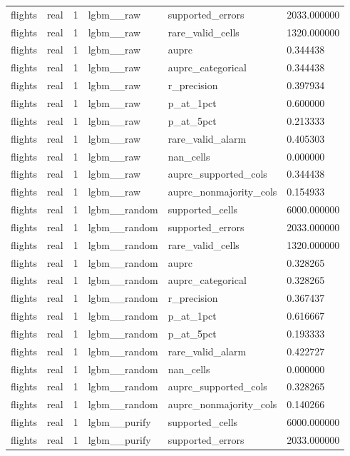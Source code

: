 \begin{tabular}{llllll}
flights & real & 1 & lgbm\_\_raw & supported\_errors & 2033.000000 \\
flights & real & 1 & lgbm\_\_raw & rare\_valid\_cells & 1320.000000 \\
flights & real & 1 & lgbm\_\_raw & auprc & 0.344438 \\
flights & real & 1 & lgbm\_\_raw & auprc\_categorical & 0.344438 \\
flights & real & 1 & lgbm\_\_raw & r\_precision & 0.397934 \\
flights & real & 1 & lgbm\_\_raw & p\_at\_1pct & 0.600000 \\
flights & real & 1 & lgbm\_\_raw & p\_at\_5pct & 0.213333 \\
flights & real & 1 & lgbm\_\_raw & rare\_valid\_alarm & 0.405303 \\
flights & real & 1 & lgbm\_\_raw & nan\_cells & 0.000000 \\
flights & real & 1 & lgbm\_\_raw & auprc\_supported\_cols & 0.344438 \\
flights & real & 1 & lgbm\_\_raw & auprc\_nonmajority\_cols & 0.154933 \\
flights & real & 1 & lgbm\_\_random & supported\_cells & 6000.000000 \\
flights & real & 1 & lgbm\_\_random & supported\_errors & 2033.000000 \\
flights & real & 1 & lgbm\_\_random & rare\_valid\_cells & 1320.000000 \\
flights & real & 1 & lgbm\_\_random & auprc & 0.328265 \\
flights & real & 1 & lgbm\_\_random & auprc\_categorical & 0.328265 \\
flights & real & 1 & lgbm\_\_random & r\_precision & 0.367437 \\
flights & real & 1 & lgbm\_\_random & p\_at\_1pct & 0.616667 \\
flights & real & 1 & lgbm\_\_random & p\_at\_5pct & 0.193333 \\
flights & real & 1 & lgbm\_\_random & rare\_valid\_alarm & 0.422727 \\
flights & real & 1 & lgbm\_\_random & nan\_cells & 0.000000 \\
flights & real & 1 & lgbm\_\_random & auprc\_supported\_cols & 0.328265 \\
flights & real & 1 & lgbm\_\_random & auprc\_nonmajority\_cols & 0.140266 \\
flights & real & 1 & lgbm\_\_purify & supported\_cells & 6000.000000 \\
flights & real & 1 & lgbm\_\_purify & supported\_errors & 2033.000000 \\

\end{tabular}
